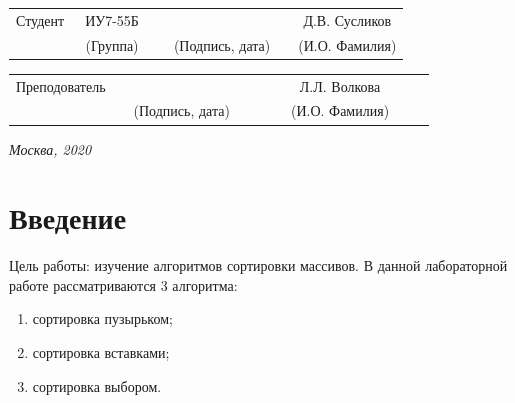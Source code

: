 \documentclass[14pt, a4paper]{extarticle}
\begin{document}
	
	\noindent
	\\
	
	\noindent
	\\
	
	\vspace{1.5cm}
	\noindent
	\begin{tabular}{l c c c c c}
		Студент      & ~ИУ7-55Б~               & \hspace{2.5cm} & \hspace{2cm}                 & &  Д.В. 
		Сусликов \\\cline{2-2}\cline{4-4} \cline{6-6} 
		\hspace{3cm} & {\footnotesize(Группа)} &                & {\footnotesize(Подпись, дата)} & & {\footnotesize(И.О. Фамилия)}
	\end{tabular}
	
	\noindent
	\begin{tabular}{l c c c c}
		Преподователь & \hspace{5cm}   & \hspace{2cm}                 & & ~~~~~~Л.Л. Волкова~~~~~~\\\cline{3-3} \cline{5-5} 
		\hspace{3cm}  &                & {\footnotesize(Подпись, дата)} & & {\footnotesize(И.О. Фамилия)}
	\end{tabular}
	
	\vspace{0.6cm}
	\begin{center}	
		\vfill
		\large \textit {Москва, 2020}
	\end{center}
	
	\thispagestyle {empty}
	\pagebreak
	
	\clearpage
	\tableofcontents
	
	
	\clearpage
	\section*{Введение}
	Цель работы: изучение алгоритмов сортировки массивов. В данной лабораторной работе рассматриваются 3 алгоритма:
	\begin{enumerate}
		\item[1)] сортировка пузырьком;
		\item[2)] сортировка вставками;
		\item[3)] сортировка выбором. 
	\end{enumerate}\par
\end{document}
